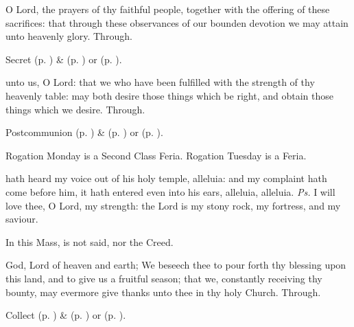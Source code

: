 \secret
{} O Lord, the prayers of thy faithful people, together with the offering of these sacrifices: that through these observances of our bounden devotion we may attain unto heavenly glory. Through.
\begin{rubric}
     Secret  (p. \pageref{SPMaryInEaster}) \&   (p. \pageref{SPAgainst}) or  (p. \pageref{SPChiefBishop}).
\end{rubric}


\postcommunion
{} unto us, O Lord: that we who have been fulfilled with the strength of thy heavenly table: may both desire those things which be right, and obtain those things which we desire. Through.
\begin{rubric}
     Postcommunion  (p. \pageref{SPMaryInEaster}) \&   (p. \pageref{SPAgainst}) or  (p. \pageref{SPChiefBishop}).
\end{rubric}


\clearpage
{}
\begin{rubric}
	Rogation Monday is a Second Class Feria. Rogation Tuesday is a Feria.
\end{rubric}

\introit
{} hath heard my voice out of his holy temple, alleluia: and my complaint hath come before him, it hath entered even into his ears, alleluia, alleluia. \textit{Ps.} I will love thee, O Lord, my strength: the Lord is my stony rock, my fortress, and my saviour.
\begin{rubric}
    In this Mass,  is not said, nor the Creed.
\end{rubric}

\collect
{} God, Lord of heaven and earth; We beseech thee to pour forth thy blessing upon this land, and to give us a fruitful season; that we, constantly receiving thy bounty, may evermore give thanks unto thee in thy holy Church. Through.
\begin{rubric}
     Collect  (p. \pageref{SPMaryInEaster}) \&   (p. \pageref{SPAgainst}) or  (p. \pageref{SPChiefBishop}).
\end{rubric}

